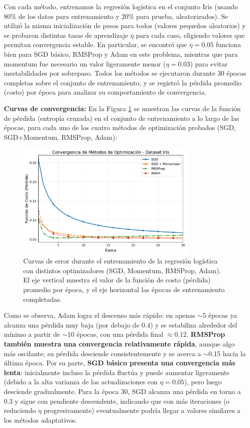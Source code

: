 \documentclass[12pt, spanish]{article}
\begin{document}
Con cada método, entrenamos la regresión logística en el conjunto Iris (usando 80\% de los datos para entrenamiento y 20\% para prueba, aleatorizados). Se utilizó la misma inicialización de pesos para todos (valores pequeños aleatorios) y se probaron distintas tasas de aprendizaje $\eta$ para cada caso, eligiendo valores que permitan convergencia estable. En particular, se encontró que $\eta=0.05$ funciona bien para SGD básico, RMSProp y Adam en este problema, mientras que para momentum fue necesario un valor ligeramente menor ($\eta=0.03$) para evitar inestabilidades por sobrepaso. Todos los métodos se ejecutaron durante 30 épocas completas sobre el conjunto de entrenamiento, y se registró la pérdida promedio (costo) por época para analizar su comportamiento de convergencia.

\textbf{Curvas de convergencia:} En la Figura \ref{fig:curvas} se muestran las curvas de la función de pérdida (entropía cruzada) en el conjunto de entrenamiento a lo largo de las épocas, para cada uno de los cuatro métodos de optimización probados (SGD, SGD+Momentum, RMSProp, Adam):

\begin{figure}[h]
\centering
\includegraphics[width=0.8\textwidth]{curvas_convergencia.pdf}
\caption{Curvas de error durante el entrenamiento de la regresión logística con distintos optimizadores (SGD, Momentum, RMSProp, Adam). El eje vertical muestra el valor de la función de costo (pérdida) promedio por época, y el eje horizontal las épocas de entrenamiento completadas.}
\label{fig:curvas}
\end{figure}

Como se observa, Adam logra el descenso más rápido: en apenas $\sim$5 épocas ya alcanza una pérdida muy baja (por debajo de 0.4) y se estabiliza alrededor del mínimo a partir de $\sim$10 épocas, con una pérdida final $\approx 0.12$. \textbf{RMSProp también muestra una convergencia relativamente rápida}, aunque algo más oscilante; su pérdida desciende consistentemente y se acerca a $\sim$0.15 hacia la última época. Por su parte, \textbf{SGD básico presenta una convergencia más lenta}: inicialmente incluso la pérdida fluctúa y puede aumentar ligeramente (debido a la alta varianza de las actualizaciones con $\eta=0.05$), pero luego desciende gradualmente. Para la época 30, SGD alcanza una pérdida en torno a 0.3 y sigue con pendiente descendente, indicando que con más iteraciones (o reduciendo $\eta$ progresivamente) eventualmente podría llegar a valores similares a los métodos adaptativos.
\end{document}
